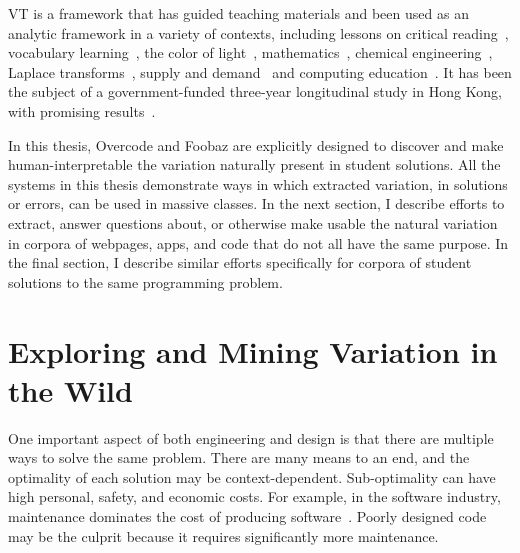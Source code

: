 VT is a framework that has guided teaching materials and been used as an analytic framework in a variety of contexts, including lessons on critical reading~\cite{noble1998contents}, vocabulary learning~\cite{doi:10.1108/IJLLS-10-2014-0038}, the color of light~\cite{Ling2006}, mathematics~\cite{Pythagoras233}, chemical engineering~\cite{C2RP20145C}, Laplace transforms~\cite{carstensen2004laplace}, supply and demand~\cite{marton2006some} and computing education~\cite{suhonen2007applications}. It has been the subject of a government-funded three-year longitudinal study in Hong Kong, with promising results~\cite{lo2005each}. 

In this thesis, Overcode and Foobaz are explicitly designed to discover and make human-interpretable the variation naturally present in student solutions. All the systems in this thesis demonstrate ways in which extracted variation, in solutions or errors, can be used in massive classes. In the next section, I describe efforts to extract, answer questions about, or otherwise make usable the natural variation in corpora of webpages, apps, and code that do not all have the same purpose. In the final section, I describe similar efforts specifically for corpora of student solutions to the same programming problem.


\section{Exploring and Mining Variation in the Wild}

One important aspect of both engineering and design is that there are multiple ways to solve the same problem. There are many means to an end, and the optimality of each solution may be context-dependent. Sub-optimality can have high personal, safety, and economic costs. For example, in the software industry, maintenance dominates the cost of producing software~\cite{fox2013engineering}. Poorly designed code may be the culprit because it requires significantly more maintenance.

\begin{comment}
There’s no silver bullet for becoming a great engineer. However, best practices will probably always include analyzing others’ designs, highlighting their successes and failures, as well as composing one’s own designs and receiving critiques from others.

This method of training is particularly exciting today, when there is such a diversity of design examples available online. Thousands of apps are available for download from app stores. Kaggle maching learning competition submissions are not public by default, but are sometimes released by authors and collected for the benefit of others. Github and Bitbucket host millions of repositories, many of them public and searchable.
\end{comment}

